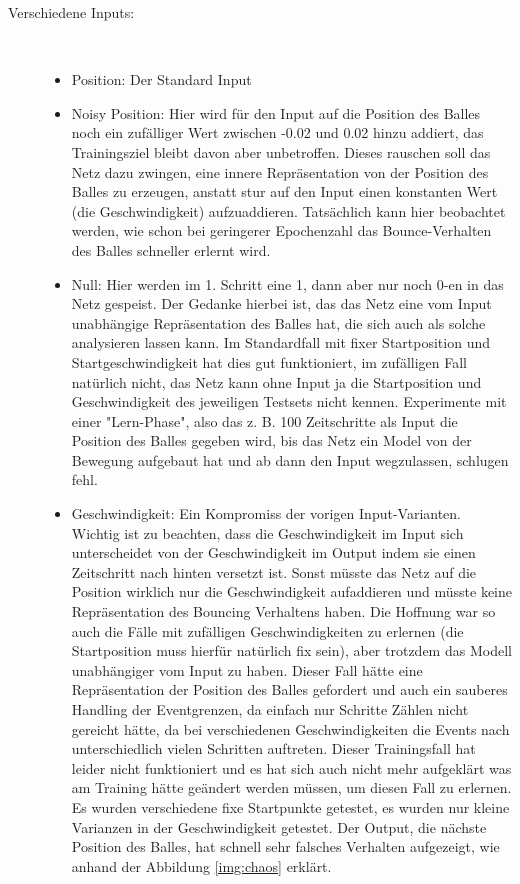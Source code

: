 \begin{description}
	\item[Verschiedene Inputs:] \hfill \\
	\begin{itemize}
		\item Position: Der Standard Input
		\item Noisy Position: Hier wird für den Input auf die Position des Balles noch ein zufälliger Wert zwischen -0.02 und 0.02 hinzu addiert, das Trainingsziel bleibt davon aber unbetroffen. Dieses rauschen soll das Netz dazu zwingen, eine innere Repräsentation von der Position des Balles zu erzeugen, anstatt stur auf den Input einen konstanten Wert (die Geschwindigkeit) aufzuaddieren. Tatsächlich kann hier beobachtet werden, wie schon bei geringerer Epochenzahl das Bounce-Verhalten des Balles schneller erlernt wird.
		\item Null: Hier werden im 1. Schritt eine 1, dann aber nur noch 0-en in das Netz gespeist. Der Gedanke hierbei ist, das das Netz eine vom Input unabhängige Repräsentation des Balles hat, die sich auch als solche analysieren lassen kann. Im Standardfall mit fixer Startposition und Startgeschwindigkeit hat dies gut funktioniert, im zufälligen Fall natürlich nicht, das Netz kann ohne Input ja die Startposition und Geschwindigkeit des jeweiligen Testsets nicht kennen. Experimente mit einer "Lern-Phase", also das z. B. 100 Zeitschritte als Input die Position des Balles gegeben wird, bis das Netz ein Model von der Bewegung aufgebaut hat und ab dann den Input wegzulassen, schlugen fehl. 
		\item Geschwindigkeit: Ein Kompromiss der vorigen Input-Varianten. Wichtig ist zu beachten, dass die Geschwindigkeit im Input sich unterscheidet von der Geschwindigkeit im Output indem sie einen Zeitschritt nach hinten versetzt ist. Sonst müsste das Netz auf die Position wirklich nur die Geschwindigkeit aufaddieren und müsste keine Repräsentation des Bouncing Verhaltens haben. Die Hoffnung war so auch die Fälle mit zufälligen Geschwindigkeiten zu erlernen (die Startposition muss hierfür natürlich fix sein), aber trotzdem das Modell unabhängiger vom Input zu haben. Dieser Fall hätte eine Repräsentation der Position des Balles gefordert und auch ein sauberes Handling der Eventgrenzen, da einfach nur Schritte Zählen nicht gereicht hätte, da bei verschiedenen Geschwindigkeiten die Events nach unterschiedlich vielen Schritten auftreten. Dieser Trainingsfall hat leider nicht funktioniert und es hat sich auch nicht mehr aufgeklärt was am Training hätte geändert werden müssen, um diesen Fall zu erlernen. Es wurden verschiedene fixe Startpunkte getestet, es wurden nur kleine Varianzen in der Geschwindigkeit getestet. Der Output, die nächste Position des Balles, hat schnell sehr falsches Verhalten aufgezeigt, wie anhand der Abbildung \ref{img:chaos} erklärt.
	\end{itemize}


\end{description}
